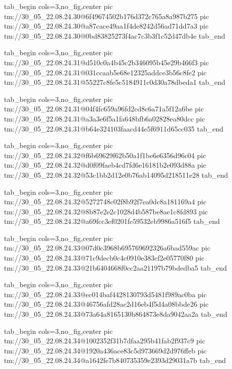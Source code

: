  
 
 
 
 

\qqSecCmtScr


\ifcmt
  tab_begin cols=3,no_fig,center
    pic tm://30_05_22.08.24.30@6f49674502b176d372c765a8a987b275
    pic tm://30_05_22.08.24.30@a87cace49aa1f4de8242d56ad71dd7a3
    pic tm://30_05_22.08.24.30@0bd83825273f4ac7c3b3f1c52d47db4e
  tab_end
\fi


\ifcmt
  tab_begin cols=3,no_fig,center
    pic tm://30_05_22.08.24.31@d510c0a4b45c2b346095b45e29b466f3
    pic tm://30_05_22.08.24.31@031ccaab5e68e12325addce3b56c8fe2
    pic tm://30_05_22.08.24.31@55227c8fe5c5184911c0d30a78dbeda1
  tab_end
\fi


\ifcmt
  tab_begin cols=3,no_fig,center
    pic tm://30_05_22.08.24.31@04f4fc659a96fd2cd8c6a71a5f12a6be
    pic tm://30_05_22.08.24.31@a3a3e6f5a1fa648bfb6a02828ea80dcc
    pic tm://30_05_22.08.24.31@b64e324103faacd44e5f6911d65cc035
  tab_end
\fi


\ifcmt
  tab_begin cols=3,no_fig,center
    pic tm://30_05_22.08.24.32@f6b69629f62b50a1f1be6e6356d96c04
    pic tm://30_05_22.08.24.32@d0f09faeb4cd7fd6e16181b2e093d88a
    pic tm://30_05_22.08.24.32@53c1bb2d12e0b76ab14095d218511e28
  tab_end
\fi


\ifcmt
  tab_begin cols=3,no_fig,center
    pic tm://30_05_22.08.24.32@5272748c02f8b92f7ea0dc8a181169a4
    pic tm://30_05_22.08.24.32@8b87e2e2c1028d4b587be8ae1c8fd893
    pic tm://30_05_22.08.24.32@a69fcc3ef0201fc59532eb9986a516f5
  tab_end
\fi


\ifcmt
  tab_begin cols=3,no_fig,center
    pic tm://30_05_22.08.24.33@07d0c3968b695769692326a6bad559ac
    pic tm://30_05_22.08.24.33@71c9decb0c4c0910e383cf2e05770f80
    pic tm://30_05_22.08.24.33@21b6404668f0cc2aa21197b79bdedba5
  tab_end
\fi


\ifcmt
  tab_begin cols=3,no_fig,center
    pic tm://30_05_22.08.24.33@ec014baf4428130793d5481f989ac0ba
    pic tm://30_05_22.08.24.33@46756afd28ac2d16eb4f5d4a08bbde26
    pic tm://30_05_22.08.24.33@73a64a8165130b864873e8da9042aa2a
  tab_end
\fi


\ifcmt
  tab_begin cols=3,no_fig,center
    pic tm://30_05_22.08.24.34@1002352f31b7dfaa295b41fab2f937c9
    pic tm://30_05_22.08.24.34@1920a436ace83c5d973669d2d976ffeb
    pic tm://30_05_22.08.24.34@a1642fe7b840735359e2393d29031a7b
  tab_end
\fi


